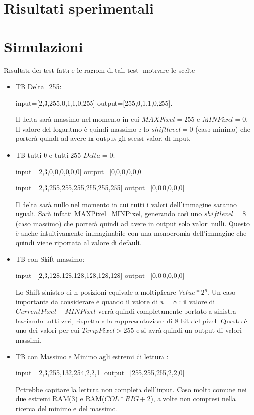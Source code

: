 \documentclass{article}
\begin{document}
\section{Risultati sperimentali}
\section{Simulazioni}
\label{main-text}

Risultati  dei  test  fatti  e  le ragioni di tali test -motivare le scelte
\begin{itemize}
\item TB Delta=255:

 input=[2,3,255,0,1,1,0,255]
 output=[255,0,1,1,0,255].    
    
   Il delta sarà massimo nel momento in cui \(MAXPixel = 255\) e \(MINPixel = 0\). Il valore del logaritmo è quindi massimo e lo \(shiftlevel=0\) (caso minimo) che porterà quindi ad avere in output gli stessi valori di input.
\item TB tutti 0 e tutti 255 \(Delta=0\):

 input=[2,3,0,0,0,0,0,0] 
 output=[0,0,0,0,0,0]
 
  input=[2,3,255,255,255,255,255,255] 
 output=[0,0,0,0,0,0]
 
 Il delta sarà nullo nel momento in cui tutti i valori dell'immagine saranno uguali. Sarà infatti MAXPixel=MINPixel, generando così uno \(shiftlevel=8\) (caso massimo) che porterà quindi ad avere in output solo valori nulli. Questo è anche intuitivamente immaginabile con una monocromia dell'immagine che quindi viene riportata al valore di default.
 \item TB con Shift massimo:
 
 input=[2,3,128,128,128,128,128,128] 
 output=[0,0,0,0,0,0]

Lo Shift sinistro di n posizioni equivale a moltiplicare \(Value*2^{n}\). Un caso importante da considerare è quando il valore di \(n=8\) : il valore di \(Current Pixel-MINPixel\) verrà quindi completamente portato a sinistra lasciando tutti zeri, rispetto alla rappresentazione di 8 bit del pixel. Questo è uno dei valori per cui \(Temp Pixel>255\) e si avrà quindi un output di valori massimi.
\item TB con Massimo e Minimo agli estremi di lettura : 
 
 input=[2,3,255,132,254,2,2,1] 
 output=[255,255,255,2,2,0]
 
 Potrebbe capitare la lettura non completa dell'input. Caso molto comune nei due estremi RAM(3) e RAM(\(COL*RIG+2\)), a volte non compresi nella ricerca del minimo e del massimo.
 

\end{itemize}
\end{document}
